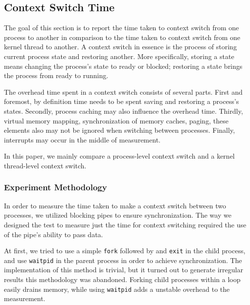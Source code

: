 \documentclass{article} %
\begin{document}
\subsection{Context Switch Time}
The goal of this section is to report the time taken to context switch from
one process to another in comparison to the time taken to context switch from
one kernel thread to another.  A context switch in essence is the process of
storing current process state and restoring another. More specifically,
storing a state means changing the process's state to ready or blocked;
restoring a state brings the process from ready to running.

The overhead time spent in a context switch consists of several parts.  First
and foremost, by definition time needs to be spent saving and restoring
a process's states.  Secondly, process caching may also influence the overhead
time. Thirdly, virtual memory mapping, synchronization of memory caches,
paging, these elements also may not be ignored when switching between
processes. Finally, interrupts may occur in the middle of measurement.

In this paper, we mainly compare a process-level context switch and a kernel
thread-level context switch.

\subsubsection{Experiment Methodology}
In order to measure the time taken to make a context switch between two
processes, we utilized blocking pipes to ensure synchronization. The way we
designed the test to measure just the time for context switching required the
use of the pipe's ability to pass data.

At first, we tried to use a simple \texttt{fork} followed by and \texttt{exit}
in the child process, and use \texttt{waitpid} in the parent process in order
to achieve synchronization. The implementation of this method is trivial, but
it turned out to generate irregular results this methodology was abandoned. Forking child processes within
a loop easily drains memory, while using \texttt{waitpid} adds a unstable
overhead to the measurement.
\end{document}
